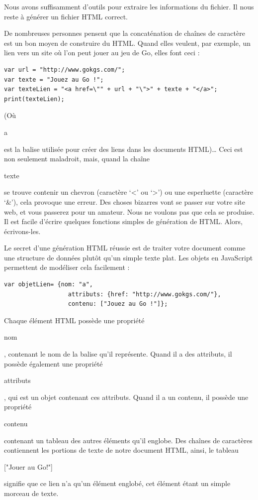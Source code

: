 \documentclass{FramateX}
\renewcommand{\texttt}[1]{\begin{sffamily}{#1}\end{sffamily}}
\begin{document}
\begin{center}\end{center}

Nous avons suffisamment d'outils pour extraire les informations du
fichier. Il nous reste à générer un fichier HTML correct.

De nombreuses personnes pensent que la concaténation de chaînes de
caractère est un bon moyen de construire du HTML. Quand elles veulent,
par exemple, un lien vers un site où l'on peut jouer au jeu de Go, elles
font ceci :

\begin{lstlisting}
var url = "http://www.gokgs.com/";
var texte = "Jouez au Go !";
var texteLien = "<a href=\"" + url + "\">" + texte + "</a>";
print(texteLien);
\end{lstlisting}
(Où \texttt{a} est la balise utilisée pour créer des liens dans les
documents HTML)\ldots{} Ceci est non seulement maladroit, mais, quand la
chaîne \texttt{texte} se trouve contenir un chevron (caractère
`\textless{}' ou `\textgreater{}') ou une esperluette (caractère `\&'),
cela provoque une erreur. Des choses bizarres vont se passer sur votre
site web, et vous passerez pour un amateur. Nous ne voulons pas que cela
se produise. Il est facile d'écrire quelques fonctions simples de
génération de HTML. Alors, écrivons-les.

\begin{center}\end{center}

Le secret d'une génération HTML réussie est de traiter votre document
comme une structure de données plutôt qu'un simple texte plat. Les
objets en JavaScript permettent de modéliser cela facilement :

\begin{lstlisting}
var objetLien= {nom: "a",
                  attributs: {href: "http://www.gokgs.com/"},
                  contenu: ["Jouez au Go !"]};
\end{lstlisting}
Chaque élément HTML possède une propriété \texttt{nom}, contenant le nom
de la balise qu'il représente. Quand il a des attributs, il possède
également une propriété \texttt{attributs}, qui est un objet contenant
ces attributs. Quand il a un contenu, il possède une propriété
\texttt{contenu} contenant un tableau des autres éléments qu'il englobe.
Des chaînes de caractères contiennent les portions de texte de notre
document HTML, ainsi, le tableau \texttt{{[}"Jouer au Go!"{]}} signifie
que ce lien n'a qu'un élément englobé, cet élément étant un simple
morceau de texte.
\end{document}
